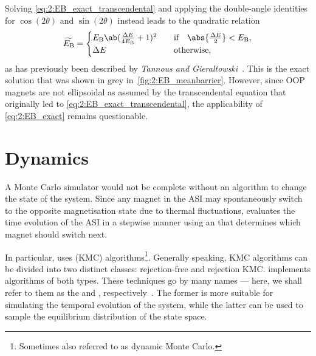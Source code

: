 Solving \cref{eq:2:EB_exact_transcendental} and applying the double-angle identities for $\cos(2\theta)$ and $\sin(2\theta)$ instead leads to the quadratic relation %
\begin{equation}
	\label{eq:2:EB_exact}
	\widetilde{E_\mathrm{B}} = \begin{cases}
		E_\mathrm{B} \ab(\frac{\Delta E}{4 E_\mathrm{B}} + 1)^2 & \quad \text{if} \quad \abs{\frac{\Delta E}{2}} < E_\mathrm{B}, \\
		\Delta E & \quad \text{otherwise,} \\
	\end{cases}
\end{equation}
as has previously been described by \textit{Tannous and Gieraltowski}~\cite{StonerWohlfarth2008}.
This is the exact solution that was shown in grey in~\cref{fig:2:EB_meanbarrier}.
However, since OOP magnets are not ellipsoidal as assumed by the transcendental equation that originally led to \cref{eq:2:EB_exact_transcendental}, the applicability of \cref{eq:2:EB_exact} remains questionable.

\newpage %
\section{Dynamics}\label{sec:2:Dynamics}
A Monte Carlo simulator would not be complete without an algorithm to change the state of the system.
Since any magnet in the ASI may spontaneously switch to the opposite magnetisation state due to thermal fluctuations, \hotspice evaluates the time evolution of the ASI in a stepwise manner using an  that determines which magnet should switch next. \par
In particular, \hotspice uses  (KMC) algorithms\footnote{Sometimes also referred to as dynamic Monte Carlo.}.
Generally speaking, KMC algorithms can be divided into two distinct classes: rejection-free and rejection KMC.
\hotspice implements algorithms of both types.
These techniques go by many names --- here, we shall refer to them as the \emph{} and \emph{}, respectively~\cite{gillespie1976general,PhysicalTimeKMC}.
The former is more suitable for simulating the temporal evolution of the system, while the latter can be used to sample the equilibrium distribution of the state space.

